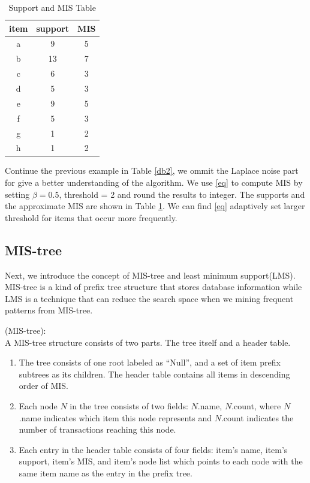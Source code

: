 \documentclass[conference]{IEEEtran}
\begin{document}
\begin{table}[htbp]
    \caption{Support and MIS Table}
    \centering
    \begin{tabular}{|c|c|c|}
    \hline
    item & support & MIS \\ \hline
    a    & 9      & 5   \\ \hline
    b    & 13      & 7  \\ \hline
    c    & 6      & 3   \\ \hline
    d    & 5       & 3   \\ \hline
    e    & 9       & 5   \\ \hline
    f    & 5       & 3   \\ \hline
    g    & 1       & 2   \\ \hline
    h    & 1       & 2   \\ \hline
    \end{tabular}
    \label{MIS}
\end{table}

\begin{example}  
    Continue the previous example in Table \ref{db2}, we ommit the Laplace noise part for give a better understanding of the algorithm.
    We use \eqref{eq} to compute MIS by setting $\beta=0.5$, threshold = 2 and round the results to integer.
    The supports and the approximate MIS are shown in Table \ref{MIS}.
    We can find \eqref{eq} adaptively set larger threshold for items that occur more frequently.
\end{example}

\subsection{MIS-tree}
Next, we introduce the concept of MIS-tree and least minimum support(LMS). 
MIS-tree is a kind of prefix tree structure that stores database information while LMS is a technique that can reduce the search space when we mining frequent patterns from MIS-tree.
\begin{definition}{(MIS-tree):}\\
A MIS-tree structure consists of two parts. The tree itself and a header table.
\end{definition}
\begin{enumerate}
    \item The tree consists of one root labeled as ``Null'', and a set of item prefix subtrees as its children. 
    The header table contains all items in descending order of MIS.
    \item Each node $N$ in the tree consists of two fields: $N$.name, $N$.count, where $N$.name indicates which item this node represents and $N$.count indicates the number of transactions reaching this node.
    \item Each entry in the header table consists of four fields: item's name, item's support, item's MIS, and 
    item's node list which points to each node with the same item name as the entry in the prefix tree.
\end{enumerate}
\end{document}
